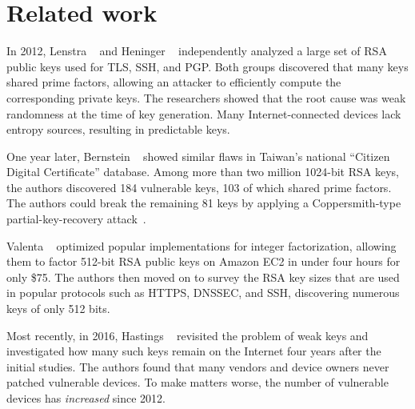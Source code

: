 \section{Related work}
\label{sec:related}
In 2012, Lenstra \ea~\cite{Lenstra2012a} and Heninger \ea~\cite{Heninger2012a}
independently analyzed a large set of RSA public keys used for TLS, SSH, and
PGP.  Both groups discovered that many keys shared prime factors, allowing an
attacker to efficiently compute the corresponding private keys.  The researchers
showed that the root cause was weak randomness at the time of key generation.
Many Internet-connected devices lack entropy sources, resulting in predictable
keys.

One year later, Bernstein \ea~\cite{Bernstein2013a} showed similar flaws in
Taiwan's national ``Citizen Digital Certificate'' database.  Among more than two
million 1024-bit RSA keys, the authors discovered 184 vulnerable keys, 103 of
which shared prime factors.  The authors could break the remaining 81 keys by
applying a Coppersmith-type partial-key-recovery
attack~\cite{Coppersmith1996a,Coppersmith1997a}.

Valenta \ea~\cite{Valenta2016a} optimized popular implementations for integer
factorization, allowing them to factor 512-bit RSA public keys on Amazon EC2 in
under four hours for only \$75.  The authors then moved on to survey the RSA key
sizes that are used in popular protocols such as HTTPS, DNSSEC, and SSH,
discovering numerous keys of only 512 bits.

Most recently, in 2016, Hastings \ea~\cite{Hastings2016a} revisited the problem
of weak keys and investigated how many such keys remain on the Internet four
years after the initial studies.  The authors found that many vendors and device
owners never patched vulnerable devices.  To make matters worse, the number of
vulnerable devices has \emph{increased} since 2012.
